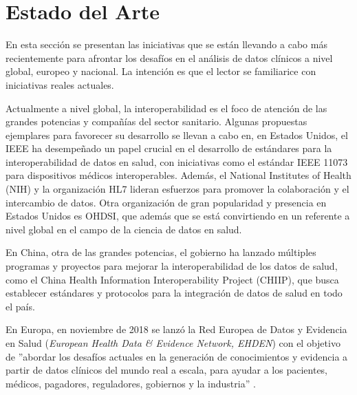 \section{Estado del Arte} \label{sec:01EstadoArte} 

En esta sección se presentan las iniciativas que se están llevando a cabo más recientemente para afrontar los desafíos en el análisis de datos clínicos a nivel global, europeo y nacional. La intención es que el lector se familiarice con iniciativas reales actuales.

Actualmente a nivel global, la interoperabilidad es el foco de atención de las grandes potencias y compañías del sector sanitario. Algunas propuestas ejemplares para favorecer su desarrollo se llevan a cabo en, en Estados Unidos, el IEEE ha desempeñado un papel crucial en el desarrollo de estándares para la interoperabilidad de datos en salud, con iniciativas como el estándar IEEE 11073 para dispositivos médicos interoperables. Además, el National Institutes of Health (NIH) y la organización HL7 lideran esfuerzos para promover la colaboración y el intercambio de datos. Otra organización de gran popularidad y presencia en Estados Unidos es OHDSI, que además que se está convirtiendo en un referente a nivel global en el campo de la ciencia de datos en salud.

En China, otra de las grandes potencias, el gobierno ha lanzado múltiples programas y proyectos para mejorar la interoperabilidad de los datos de salud, como el China Health Information Interoperability Project (CHIIP), que busca establecer estándares y protocolos para la integración de datos de salud en todo el país.


En Europa, en noviembre de 2018 se lanzó la Red Europea de Datos y Evidencia en Salud (\textit{European Health Data \& Evidence Network, EHDEN}) con el objetivo de ''abordar los desafíos actuales en la generación de conocimientos y evidencia a partir de datos clínicos del mundo real a escala, para ayudar a los pacientes, médicos, pagadores, reguladores, gobiernos y la industria'' \cite{ehden}.

